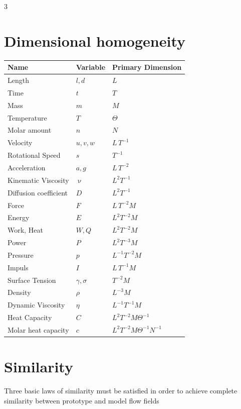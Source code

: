 \documentclass[9pt, landscape, a4paper]{article}
\renewcommand{\nu}{\upnu}
\begin{document}
\begin{multicols*}{3}
\section{Dimensional homogeneity}
\begin{center}
  \renewcommand{\arraystretch}{1.2}
  \begin{tabularx}{\linewidth}{|X|l|X|}
    \hline \textbf{Name} & \textbf{Variable} & \textbf{Primary Dimension} \\
    \hline Length & $l,d$ & $L$ \\
    \hline Time & $t$ & $T$ \\
    \hline Mass & $m$ & $M$ \\
    \hline Temperature & $T$ & $\Theta$ \\
    \hline Molar amount & $n$ & $N$ \\
    \hline Velocity & $u,v,w$ & $L\,T^{-1}$ \\
    \hline Rotational Speed & $s$ & $T^{-1}$ \\
    \hline Acceleration & $a,g$ & $L\,T^{-2}$ \\
    \hline Kinematic Viscosity & $\nu$ & $L^{2}T^{-1}$ \\
    \hline Diffusion coefficient & $D$ & $L^{2}T^{-1}$ \\
    \hline Force & $F$ & $L\,T^{-2}M$ \\
    \hline Energy & $E$ & $L^{2}T^{-2}M$ \\
    \hline Work, Heat & $W,Q$ & $L^{2}T^{-2}M$ \\
    \hline Power & $P$ & $L^{2}T^{-3}M$ \\
    \hline Pressure & $p$ & $L^{-1}T^{-2}M$ \\
    \hline Impuls & $I$ & $L\,T^{-1}M$ \\
    \hline Surface Tension & $\gamma,\sigma$ & $T^{-2}M$ \\
    \hline Density & $\rho$ & $L^{-3}M$ \\
    \hline Dynamic Viscosity & $\eta$ & $L^{-1}T^{-1}M$ \\
    \hline Heat Capacity & $C$ & $L^{2}T^{-2}M\Theta^{-1}$ \\
    \hline Molar heat capacity & $c$ & $L^{2}T^{-2}M\Theta^{-1}N^{-1}$ \\
    \hline
  \end{tabularx}
\end{center}

\section{Similarity}
Three basic laws of similarity must be satisfied in order to achieve complete similarity between prototype and
model flow fields

\end{multicols*}
\end{document}

